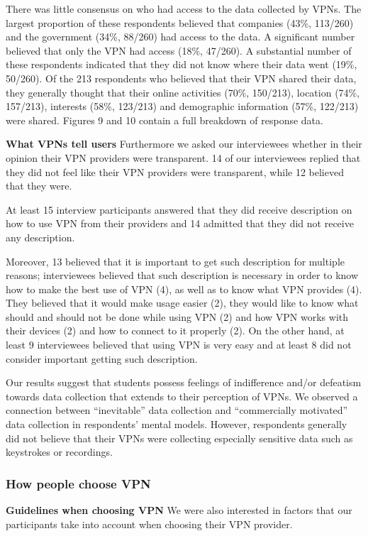There was little consensus on who had access to the data collected by VPNs.
The largest proportion of these respondents believed that companies (43\%,
113/260) and the government (34\%, 88/260) had access to the data. A
significant number believed that only the VPN had access (18\%, 47/260). A
substantial number of these respondents indicated that they did not know where
their data went (19\%, 50/260). Of the 213 respondents who believed that their
VPN shared their data, they generally thought that their online activities
(70\%, 150/213), location (74\%, 157/213), interests (58\%, 123/213) and
demographic information (57\%, 122/213) were shared. Figures 9 and 10 contain
a full breakdown of response data.

\textbf{What VPNs tell users} Furthermore we asked our interviewees whether in
their opinion their VPN providers were transparent. 14 of our interviewees
replied that they did not feel like their VPN providers were transparent,
while 12 believed that they were. 

At least 15 interview participants answered that they did receive description
on how to use VPN from their providers and 14 admitted that they did not
receive any description.  

Moreover, 13 believed that it is important to get such description for
multiple reasons; interviewees believed that such description is necessary in
order to know how to make the best use of VPN (4), as well as to know what VPN
provides (4). They believed that it would make usage easier (2), they would
like to know what should and should not be done while using VPN (2) and how
VPN works with their devices (2) and how to connect to it properly (2). On the
other hand, at least 9 interviewees believed that using VPN is very easy and
at least 8 did not consider important getting such description. 

Our results suggest that students possess feelings of indifference and/or
defeatism towards data collection that extends to their perception of VPNs. We
observed a connection between “inevitable” data collection and “commercially
motivated” data collection in respondents’ mental models. However, respondents
generally did not believe that their VPNs were collecting especially sensitive
data such as keystrokes or recordings.



\subsubsection{How people choose VPN} \label{sec:findings-choosing}
\textbf{Guidelines when choosing VPN} We were also interested in factors that
our participants take into account when choosing their VPN provider.

